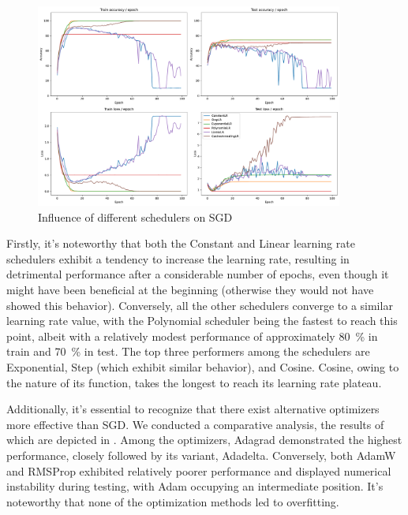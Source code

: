 \begin{figure}[H]
    \centering
    \includegraphics*[width=0.9\textwidth]{figs/CNN/schedulers_influence.pdf}
    \caption{Influence of different schedulers on SGD}
    \label{fig:schedulers_influence}
\end{figure}

Firstly, it's noteworthy that both the Constant and Linear learning rate schedulers exhibit a tendency to increase the learning rate, resulting in detrimental performance after a considerable number of epochs, even though it might have been beneficial at the beginning (otherwise they would not have showed this behavior). Conversely, all the other schedulers converge to a similar learning rate value, with the Polynomial scheduler being the fastest to reach this point, albeit with a relatively modest performance of approximately 80~\% in train and 70~\% in test. The top three performers among the schedulers are Exponential, Step (which exhibit similar behavior), and Cosine. Cosine, owing to the nature of its function, takes the longest to reach its learning rate plateau.

Additionally, it's essential to recognize that there exist alternative optimizers more effective than SGD. We conducted a comparative analysis, the results of which are depicted in . Among the optimizers, Adagrad demonstrated the highest performance, closely followed by its variant, Adadelta. Conversely, both AdamW and RMSProp exhibited relatively poorer performance and displayed numerical instability during testing, with Adam occupying an intermediate position. It's noteworthy that none of the optimization methods led to overfitting.

